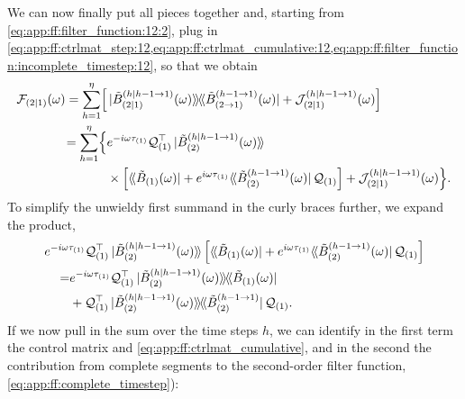 \clearpage
We can now finally put all pieces together and, starting from \cref{eq:app:ff:filter_function:12:2}, plug in \cref{eq:app:ff:ctrlmat_step:12,eq:app:ff:ctrlmat_cumulative:12,eq:app:ff:filter_function:incomplete_timestep:12}, so that we obtain
\begin{align}
    \FF_{(2|1)}(\omega) = \sum_{h=1}^{\eta}\Bigl[
                                & \dop*{\Bt_{(2|1)}\gth{h|h-1\to 1}(\omega)}{\Bt_{(2\to1)}\gth{h-1\to 1}(\omega)}
                                    + \mc{J}_{(2|1)}\gth{h|h-1\to 1}(\omega)\Bigr] \notag \\
                        = \sum_{h=1}^{\eta}\Bigl\lbrace
                                & \e^{-\i\omega\tau_{(1)}}\liouvQ_{(1)}\transpose\dket*{\Bt_{(2)}\gth{h|h-1\to 1}(\omega)} \notag \\
                                & \times\Bigl[
                                        \dbra*{\Bt_{(1)}(\omega)} + \e^{\i\omega\tau_{(1)}}\dbra*{\Bt_{(2)}\gth{h-1\to 1}(\omega)}\liouvQ_{(1)}
                                    \Bigr] + \mc{J}_{(2|1)}\gth{h|h-1\to 1}(\omega)
                                \Bigr\rbrace.
\end{align}
To simplify the unwieldy first summand in the curly braces further, we expand the product,
\begin{align}\label{eq:app:unwieldy_term}
    \MoveEqLeft \e^{-\i\omega\tau_{(1)}}\liouvQ_{(1)}\transpose\dket*{\Bt_{(2)}\gth{h|h-1\to 1}(\omega)}\left[
                \dbra*{\Bt_{(1)}(\omega)} + \e^{\i\omega\tau_{(1)}}\dbra*{\Bt_{(2)}\gth{h-1\to 1}(\omega)}\liouvQ_{(1)}
            \right] \notag \\
        = & \e^{-\i\omega\tau_{(1)}}\liouvQ_{(1)}\transpose\dop*{\Bt_{(2)}\gth{h|h-1\to 1}(\omega)}{\Bt_{(1)}(\omega)} \\
          & + \liouvQ_{(1)}\transpose\dop*{\Bt_{(2)}\gth{h|h-1\to 1}(\omega)}{\Bt_{(2)}\gth{h-1\to 1}}\liouvQ_{(1)}. \notag
\end{align}
If we now pull in the sum over the time steps $h$, we can identify in the first term the control matrix and \cref{eq:app:ff:ctrlmat_cumulative}, and in the second the contribution from complete segments to the second-order filter function, \cref{eq:app:ff:complete_timestep}):
